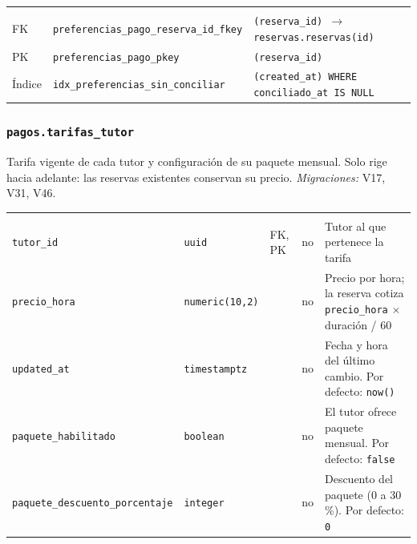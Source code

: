 {\small
\begin{xltabular}{\textwidth}{@{}>{\raggedright\arraybackslash}p{1.7cm} >{\raggedright\arraybackslash}p{4.6cm} L@{}}
    \toprule
     &  &  \\
    \midrule
    \endfirsthead
    \toprule
     &  &  \\
    \midrule
    \endhead
    \bottomrule
    \endfoot
    FK & \texttt{preferencias\_\allowbreak{}pago\_\allowbreak{}reserva\_\allowbreak{}id\_\allowbreak{}fkey} & \texttt{(\allowbreak{}reserva\_\allowbreak{}id) $\rightarrow$ reservas.reservas(\allowbreak{}id)} \\
    PK & \texttt{preferencias\_\allowbreak{}pago\_\allowbreak{}pkey} & \texttt{(\allowbreak{}reserva\_\allowbreak{}id)} \\
    Índice & \texttt{idx\_\allowbreak{}preferencias\_\allowbreak{}sin\_\allowbreak{}conciliar} & \texttt{(\allowbreak{}created\_\allowbreak{}at) WHERE conciliado\_\allowbreak{}at IS NULL} \\
\end{xltabular}
}

\subsubsection{\texorpdfstring{\texttt{pagos.tarifas\_\allowbreak{}tutor}}{pagos.tarifas\_tutor}}\label{dd:pagos.tarifas_tutor}

Tarifa vigente de cada tutor y configuración de su paquete mensual. Solo rige hacia adelante: las reservas existentes conservan su precio. \emph{Migraciones:} V17, V31, V46.

{\small
\begin{xltabular}{\textwidth}{@{}>{\raggedright\arraybackslash}p{3.6cm} >{\raggedright\arraybackslash}p{2.3cm} >{\raggedright\arraybackslash}p{1cm} >{\centering\arraybackslash}p{0.85cm} L@{}}
    \toprule
     &  &  &  &  \\
    \midrule
    \endfirsthead
    \toprule
     &  &  &  &  \\
    \midrule
    \endhead
    \bottomrule
    \endfoot
    \texttt{tutor\_\allowbreak{}id} & \texttt{uuid} & FK, PK & no & Tutor al que pertenece la tarifa \\
    \texttt{precio\_\allowbreak{}hora} & \texttt{numeric(\allowbreak{}10,\allowbreak{}2)} &  & no & Precio por hora; la reserva cotiza \texttt{precio\_hora} $\times$ duración / 60 \\
    \texttt{updated\_\allowbreak{}at} & \texttt{timestamptz} &  & no & Fecha y hora del último cambio. Por defecto: \texttt{now(\allowbreak{})} \\
    \texttt{paquete\_\allowbreak{}habilitado} & \texttt{boolean} &  & no & El tutor ofrece paquete mensual. Por defecto: \texttt{false} \\
    \texttt{paquete\_\allowbreak{}descuento\_\allowbreak{}porcentaje} & \texttt{integer} &  & no & Descuento del paquete (0 a 30\,\%). Por defecto: \texttt{0} \\
\end{xltabular}
}


